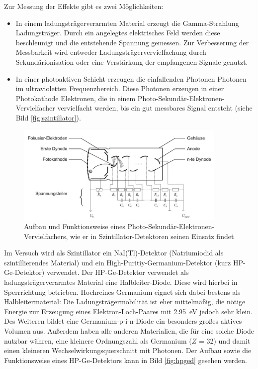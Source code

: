 \documentclass[german, %
parskip=full, %
bibliography=totoc, %
]{scrartcl}
\begin{document}
Zur Messung der Effekte gibt es zwei Möglichkeiten:
\begin{itemize}
\item In einem ladungsträgerverarmten Material erzeugt die Gamma-Strahlung Ladungsträger. Durch ein angelegtes elektrisches Feld werden diese beschleunigt und die entstehende Spannung gemessen. Zur Verbesserung der Messbarkeit wird entweder Ladungsträgervervielfachung durch Sekundärionisation oder eine Verstärkung der empfangenen Signale genutzt.
\item In einer photoaktiven Schicht erzeugen die einfallenden Photonen Photonen im ultravioletten Frequenzbereich. Diese Photonen erzeugen in einer Photokathode Elektronen, die in einem Photo-Sekundär-Elektronen-Vervielfacher vervielfacht werden, bis ein gut messbares Signal entsteht (siehe Bild \ref{fig:szintillator}).
\end{itemize}

\begin{figure}[ht] 
  \centering
     \includegraphics[width=0.9\textwidth]{Szintillatoraufbau}
  \caption{Aufbau und Funktionsweise eines Photo-Sekundär-Elektronen-Vervielfachers, wie er in Szintillator-Detektoren seinen Einsatz findet}
  \label{fig:gammaww}
\end{figure}

Im Versuch wird als Szintillator ein NaI(Tl)-Detektor (Natriumiodid als szintillierendes Material) und ein High-Puritiy-Germanium-Detektor (kurz HP-Ge-Detektor) verwendet. Der HP-Ge-Detektor verwendet als ladungsträgerverarmtes Material eine Halbleiter-Diode. Diese wird hierbei in Sperrrichtung betrieben. Hochreines Germanium eignet sich dabei bestens als Halbleitermaterial: Die Ladungsträgermobilität ist eher mittelmäßig, die nötige Energie zur Erzeugung eines Elektron-Loch-Paares mit \SI{2.95}{\electronvolt} jedoch sehr klein. Des Weiteren bildet eine Germanium-p-i-n-Diode ein besonders großes aktives Volumen aus. Außerdem haben alle anderen Materialien, die für eine solche Diode nutzbar währen, eine kleinere Ordnungszahl als Germanium ($Z$ = 32) und damit einen kleineren Wechselwirkungsquerschnitt mit Photonen. Der Aufbau sowie die Funktionsweise eines HP-Ge-Detektors kann in Bild \ref{fig:hpged} gesehen werden.
\end{document}
